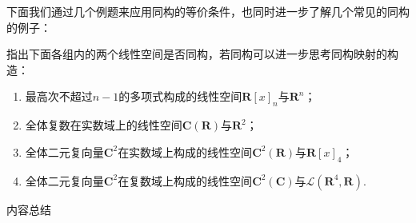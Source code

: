 下面我们通过几个例题来应用同构的等价条件，也同时进一步了解几个常见的同构的例子：
\begin{example}
    指出下面各组内的两个线性空间是否同构，若同构可以进一步思考同构映射的构造：
    \begin{enumerate}
        \item 最高次不超过$n-1$的多项式构成的线性空间$\mathbf{R}[x]_n$与$\mathbf{R}^n$；

        \item 全体复数在实数域上的线性空间$\mathbf{C}(\mathbf{R})$与$\mathbf{R}^2$；

        \item 全体二元复向量$\mathbf{C}^2$在实数域上构成的线性空间$\mathbf{C}^2(\mathbf{R})$与$\mathbf{R}[x]_4$；

        \item 全体二元复向量$\mathbf{C}^2$在复数域上构成的线性空间$\mathbf{C}^2(\mathbf{C})$与$\mathcal{L}(\mathbf{R}^4,\mathbf{R})$.
    \end{enumerate}
\end{example}
\begin{solution}

\end{solution}

\vspace{2ex}
\centerline{\heiti \Large 内容总结}

\vspace{2ex}

